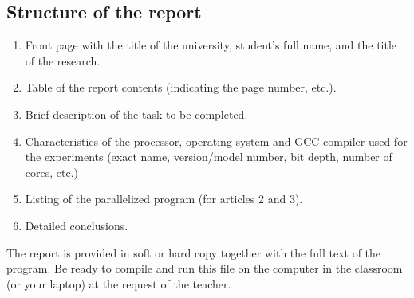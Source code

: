 { %
	\subsection{Structure of the report}
	\begin{enumerate}
		\item Front page with the title of the university, student's full name, and the title of the research.
		\item Table of the report contents (indicating the page number, etc.).
		\item Brief description of the task to be completed.
		\item Characteristics of the processor, operating system and GCC compiler used for the experiments (exact name, version/model number, bit depth, number of cores, etc.)
		\item Listing of the parallelized program (for articles 2 and 3).
		\item Detailed conclusions.
	\end{enumerate}
	\par The report is provided in soft or hard copy together with the full text of the program. Be ready to compile and run this file on the computer in the classroom (or your laptop) at the request of the teacher.
	\par
}